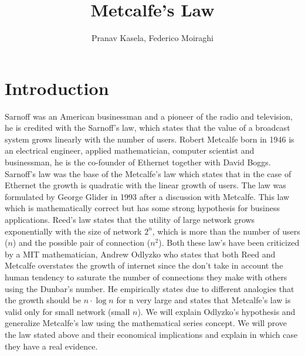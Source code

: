 \documentclass[12pt, a4page]{article}
\title{Metcalfe's Law}
\date{}
\author{Pranav Kasela, Federico Moiraghi}
\begin{document}
\maketitle
\part*{Introduction}

Sarnoff was an American businessman and a pioneer of the radio and television, he is credited with the Sarnoff’s law, which states that the value of a broadcast system grows linearly with the number of users.
Robert Metcalfe born in 1946 is an electrical engineer, applied mathematician, computer scientist and businessman, he is the co-founder of Ethernet together with David Boggs.\newline
Sarnoff’s law was the base of the Metcalfe’s law which states that in the case of Ethernet the growth is quadratic with the linear growth of users. The law was formulated by George Glider in 1993 after a discussion with Metcalfe. This law which is mathematically correct but has some strong hypothesis for business applications. \newline
Reed’s law states that the utility of large network grows exponentially with the size of network $2^n$, which is more than the number of users ($n$) and the possible pair of connection ($n^2$).
Both these law’s have been criticized by a MIT mathematician, Andrew Odlyzko who states that both Reed and Metcalfe overstates the growth of internet since the don’t take in account the human tendency to saturate the number of connections they make with others using the Dunbar’s number. He empirically states due to different analogies that the growth should be $n\cdot \log n$ for n very large and states that Metcalfe’s law is valid only for small network (small $n$). We will explain Odlyzko’s hypothesis and generalize Metcalfe’s law using the mathematical series concept.\newline
We will prove the law stated above and their economical implications and explain in which case they have a real evidence.
\newpage
\end{document}
